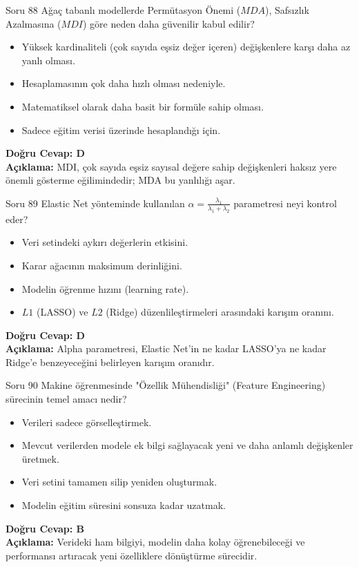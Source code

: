 \documentclass[12pt,a4paper]{article}
\begin{document}
\begin{testcard}{Soru 88}
    Ağaç tabanlı modellerde Permütasyon Önemi ($MDA$), Safsızlık Azalmasına ($MDI$) göre neden daha güvenilir kabul edilir?
    \begin{itemize}
        \item[A)] Yüksek kardinaliteli (çok sayıda eşsiz değer içeren) değişkenlere karşı daha az yanlı olması.
        \item[B)] Hesaplamasının çok daha hızlı olması nedeniyle.
        \item[C)] Matematiksel olarak daha basit bir formüle sahip olması.
        \item[D)] Sadece eğitim verisi üzerinde hesaplandığı için.
    \end{itemize}
    \tcblower
    \textbf{Doğru Cevap: D} \\
    \textbf{Açıklama:} MDI, çok sayıda eşsiz sayısal değere sahip değişkenleri haksız yere önemli gösterme eğilimindedir; MDA bu yanlılığı aşar.
\end{testcard}

\begin{testcard}{Soru 89}
    Elastic Net yönteminde kullanılan $\alpha = \frac{\lambda_1}{\lambda_1 + \lambda_2}$ parametresi neyi kontrol eder?
    \begin{itemize}
        \item[A)] Veri setindeki aykırı değerlerin etkisini.
        \item[B)] Karar ağacının maksimum derinliğini.
        \item[C)] Modelin öğrenme hızını (learning rate).
        \item[D)] $L1$ (LASSO) ve $L2$ (Ridge) düzenlileştirmeleri arasındaki karışım oranını.
    \end{itemize}
    \tcblower
    \textbf{Doğru Cevap: D} \\
    \textbf{Açıklama:} Alpha parametresi, Elastic Net'in ne kadar LASSO'ya ne kadar Ridge'e benzeyeceğini belirleyen karışım oranıdır.
\end{testcard}

\begin{testcard}{Soru 90}
    Makine öğrenmesinde "Özellik Mühendisliği" (Feature Engineering) sürecinin temel amacı nedir?
    \begin{itemize}
        \item[A)] Verileri sadece görselleştirmek.
        \item[B)] Mevcut verilerden modele ek bilgi sağlayacak yeni ve daha anlamlı değişkenler üretmek.
        \item[C)] Veri setini tamamen silip yeniden oluşturmak.
        \item[D)] Modelin eğitim süresini sonsuza kadar uzatmak.
    \end{itemize}
    \tcblower
    \textbf{Doğru Cevap: B} \\
    \textbf{Açıklama:} Verideki ham bilgiyi, modelin daha kolay öğrenebileceği ve performansı artıracak yeni özelliklere dönüştürme sürecidir.
\end{testcard}
\end{document}
